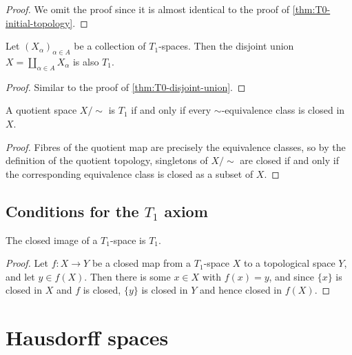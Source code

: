 \documentclass[article, a4paper, 11pt, oneside]{memoir}
\numberwithin{equation}{chapter}
\begin{document}
\begin{proof}
    We omit the proof since it is almost identical to the proof of \cref{thm:T0-initial-topology}.
\end{proof}


\begin{proposition}
    Let $(X_\alpha)_{\alpha \in A}$ be a collection of $T_1$-spaces. Then the disjoint union $X = \coprod_{\alpha \in A} X_\alpha$ is also $T_1$.
\end{proposition}

\begin{proof}
    Similar to the proof of \cref{thm:T0-disjoint-union}.
\end{proof}


\begin{proposition}
    A quotient space $X/{\sim}$ is $T_1$ if and only if every $\sim$-equivalence class is closed in $X$.
\end{proposition}

\begin{proof}
    Fibres of the quotient map are precisely the equivalence classes, so by the definition of the quotient topology, singletons of $X/{\sim}$ are closed if and only if the corresponding equivalence class is closed as a subset of $X$.
\end{proof}


\section[Conditions for the T1 axiom]{Conditions for the $T_1$ axiom}

\begin{proposition}
    The closed image\footnotemark{} of a $T_1$-space is $T_1$.
\end{proposition}

\begin{proof}%
    Let $f \colon X \to Y$ be a closed map from a $T_1$-space $X$ to a topological space $Y$, and let $y \in f(X)$. Then there is some $x \in X$ with $f(x) = y$, and since $\{x\}$ is closed in $X$ and $f$ is closed, $\{y\}$ is closed in $Y$ and hence closed in $f(X)$.
\end{proof}



\chapter{Hausdorff spaces}
\end{document}
